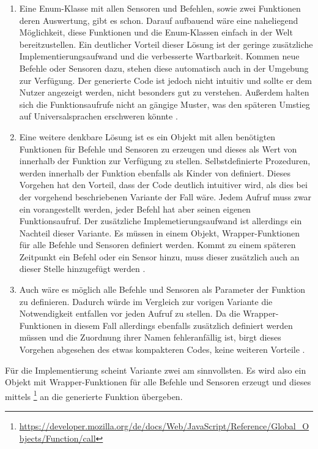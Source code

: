 \begin{enumerate}
  \item Eine Enum-Klasse mit allen Sensoren und Befehlen, sowie zwei Funktionen deren Auswertung, gibt es schon. Darauf aufbauend wäre eine naheliegend Möglichkeit, diese Funktionen und die Enum-Klassen einfach in der Welt bereitzustellen. Ein deutlicher Vorteil dieser Lösung ist der geringe zusätzliche Implementierungsaufwand und die verbesserte Wartbarkeit. Kommen neue Befehle oder Sensoren dazu, stehen diese automatisch auch in der Umgebung zur Verfügung. Der generierte Code ist jedoch nicht intuitiv und sollte er dem Nutzer angezeigt werden, nicht besonders gut zu verstehen. Außerdem halten sich die Funktionsaufrufe nicht an gängige Muster, was den späteren Umstieg auf Universalsprachen erschweren könnte .
  \item Eine weitere denkbare Lösung ist es ein Objekt mit allen benötigten Funktionen für Befehle und Sensoren zu erzeugen und dieses als Wert von  innerhalb der Funktion zur Verfügung zu stellen. Selbstdefinierte Prozeduren, werden innerhalb der Funktion ebenfalls als Kinder von  definiert. Dieses Vorgehen hat den Vorteil, dass der Code deutlich intuitiver wird, als dies bei der vorgehend beschriebenen Variante der Fall wäre. Jedem Aufruf muss zwar ein  vorangestellt werden, jeder Befehl hat aber seinen eigenen Funktionsaufruf. Der zusätzliche Implemetierungsaufwand ist allerdings ein Nachteil dieser Variante. Es müssen in einem Objekt, Wrapper-Funktionen für alle Befehle und Sensoren definiert werden. Kommt zu einem späteren Zeitpunkt ein Befehl oder ein Sensor hinzu, muss dieser zusätzlich auch an dieser Stelle hinzugefügt werden .
  \item Auch wäre es möglich alle Befehle und Sensoren als Parameter der Funktion zu definieren. Dadurch würde im Vergleich zur vorigen Variante die Notwendigkeit entfallen  vor jeden Aufruf zu stellen. Da die Wrapper-Funktionen in diesem Fall allerdings ebenfalls zusätzlich definiert werden müssen und die Zuordnung ihrer Namen fehleranfällig ist, birgt dieses Vorgehen abgesehen des etwas kompakteren Codes, keine weiteren Vorteile .
\end{enumerate}

Für die Implementierung scheint Variante zwei am sinnvollsten. Es wird also ein Objekt mit Wrapper-Funktionen für alle Befehle und Sensoren erzeugt und dieses mittels \footnote{\url{https://developer.mozilla.org/de/docs/Web/JavaScript/Reference/Global_Objects/Function/call}} an die generierte Funktion übergeben.

